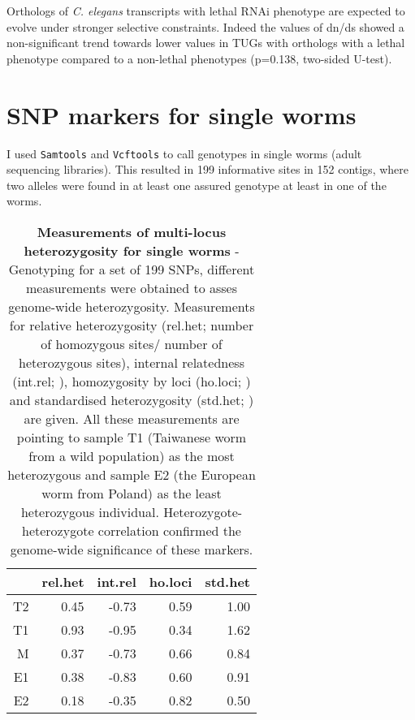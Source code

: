 Orthologs of \textit{C. elegans} transcripts with lethal RNAi
phenotype are expected to evolve under stronger selective
constraints. Indeed the values of dn/ds showed a non-significant trend
towards lower values in TUGs with orthologs with a lethal phenotype
compared to a non-lethal phenotypes (p=0.138, two-sided U-test).

\section{SNP markers for single worms}
\label{sing-w}

I used \texttt{Samtools}\cite{journals/bioinformatics/LiHWFRHMAD09}
and \texttt{Vcftools}\cite{pmid21653522} to call genotypes in single
worms (adult sequencing libraries). This resulted in 199 informative
sites in 152 contigs, where two alleles were found in at least one
assured genotype at least in one of the worms.

\begin{table}[ht]
\begin{center}
\begin{tabular}{rrrrr}
  \hline
 & rel.het & int.rel & ho.loci & std.het \\ 
  \hline
T2 & 0.45 & -0.73 & 0.59 & 1.00 \\ 
  T1 & 0.93 & -0.95 & 0.34 & 1.62 \\ 
  M & 0.37 & -0.73 & 0.66 & 0.84 \\ 
  E1 & 0.38 & -0.83 & 0.60 & 0.91 \\ 
  E2 & 0.18 & -0.35 & 0.82 & 0.50 \\ 
   \hline
\end{tabular}
\caption[Measurements of multi-locus heterozygosity for single
worms]{\textbf{Measurements of multi-locus heterozygosity for single
    worms} - Genotyping for a set of 199 SNPs, different measurements
  were obtained to asses genome-wide heterozygosity.  Measurements for
  relative heterozygosity (rel.het; number of homozygous sites/ number
  of heterozygous sites), internal relatedness (int.rel;
  \cite{pmid11571049}), homozygosity by loci (ho.loci;
  \cite{pmid17107491}) and standardised heterozygosity (std.het;
  \cite{coltman81j}) are given.  All these measurements are pointing
  to sample T1 (Taiwanese worm from a wild population) as the most
  heterozygous and sample E2 (the European worm from Poland) as the
  least heterozygous individual. Heterozygote-heterozygote correlation
  \cite{pmid21565077} confirmed the genome-wide significance of these
  markers.}
\label{snp-sing}
\end{center}
\end{table}

